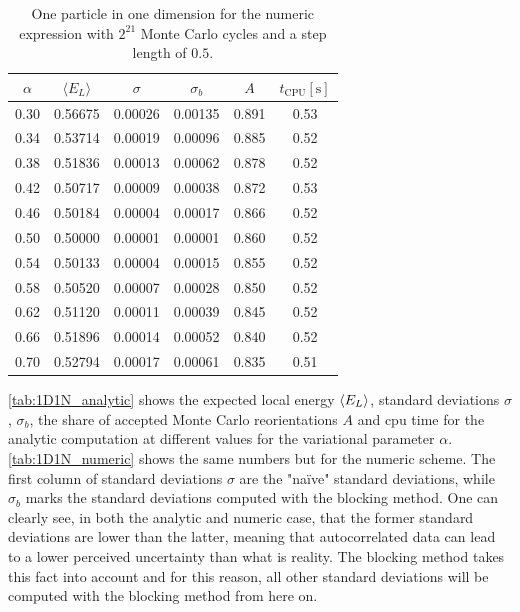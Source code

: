 \documentclass[
    a4paper, aps, twocolumn, floatfix, superscriptaddress, nofootinbib]{revtex4-1}
\newcommand{\1}{\mathds{1}}
\begin{document}
        \begin{table}
            \centering
            \caption{One particle in one dimension for the numeric expression
            with $2^{21}$ Monte Carlo cycles and a step length of $0.5$.}
            \begin{ruledtabular}
                \begin{tabular}{cccccc}
                    $\alpha$ & $\langle  E_L\rangle$ & $\sigma$ & $\sigma_b$
                    & $A$&$t_{\text{CPU}} [\si{\second}]$ \\
                    \hline
                    0.30&0.56675&0.00026&0.00135&0.891&0.53\\
                    0.34&0.53714&0.00019&0.00096&0.885&0.52\\
                    0.38&0.51836&0.00013&0.00062&0.878&0.52\\
                    0.42&0.50717&0.00009&0.00038&0.872&0.53\\
                    0.46&0.50184&0.00004&0.00017&0.866&0.52\\
                    0.50&0.50000&0.00001&0.00001&0.860&0.52\\
                    0.54&0.50133&0.00004&0.00015&0.855&0.52\\
                    0.58&0.50520&0.00007&0.00028&0.850&0.52\\
                    0.62&0.51120&0.00011&0.00039&0.845&0.52\\
                    0.66&0.51896&0.00014&0.00052&0.840&0.52\\
                    0.70&0.52794&0.00017&0.00061&0.835&0.51\\
                \end{tabular}
            \end{ruledtabular}
            \label{tab:1D1N_numeric}
        \end{table}

        \autoref{tab:1D1N_analytic} shows the expected local energy
        $\expval{E_L}$, standard deviations $\sigma$, $\sigma_b$, the share of
        accepted Monte Carlo reorientations $A$ and cpu time for the analytic
        computation at different values for the variational parameter $\alpha$.
        \autoref{tab:1D1N_numeric} shows the same numbers but for the numeric
        scheme. The first column of standard deviations $\sigma$ are the "naïve"
        standard deviations, while $\sigma_b$ marks the standard deviations
        computed with the blocking method. One can clearly see, in both the
        analytic and numeric case, that the former standard deviations are lower
        than the latter, meaning that autocorrelated data can lead to a lower
        perceived uncertainty than what is reality. The blocking method takes
        this fact into account and for this reason, all other standard
        deviations will be computed with the blocking method from here on.
\end{document}
